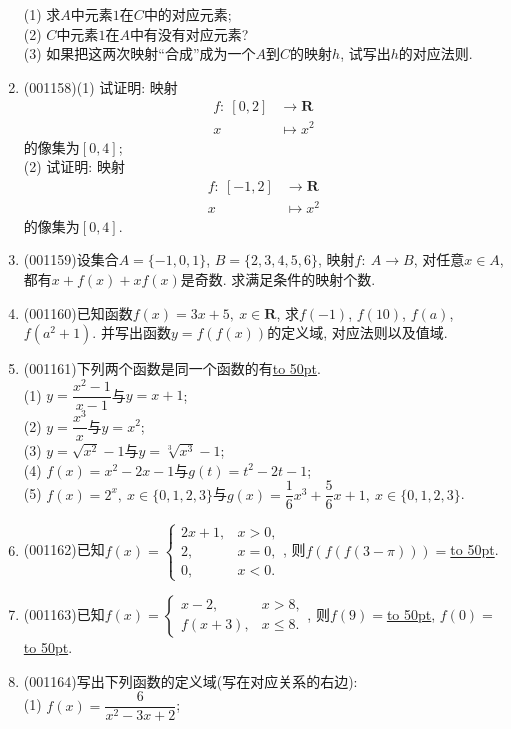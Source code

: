 \documentclass[10pt,a4paper]{article}
\newcommand{\blank}[1]{\underline{\hbox to #1pt{}}}
\begin{document}
\begin{enumerate}[1.]
(1) 求$A$中元素$1$在$C$中的对应元素;\\ 
(2) $C$中元素$1$在$A$中有没有对应元素?\\ 
(3) 如果把这两次映射``合成''成为一个$A$到$C$的映射$h$, 试写出$h$的对应法则.
\item {\tiny (001158)}(1) 试证明: 映射
\begin{align*}
f:\ [0,2]&\rightarrow \mathbf{R}\\
x&\mapsto x^2
\end{align*}
的像集为$[0,4]$;\\ 
(2) 试证明: 映射
\begin{align*}
f:\ [-1,2]&\rightarrow \mathbf{R}\\
x& \mapsto x^2
\end{align*}
的像集为$[0,4]$.
\item {\tiny (001159)}设集合$A=\{-1, 0, 1\}$, $B=\{2,3,4,5,6\}$, 映射$f:\ A\rightarrow B$, 对任意$x\in A$, 都有$x+f(x)+xf(x)$是奇数. 求满足条件的映射个数.
\item {\tiny (001160)}已知函数$f(x)=3x+5, \ x\in \mathbf{R}$, 求$f(-1)$, $f(10)$, $f(a)$, $f(a^2+1)$. 并写出函数$y=f(f(x))$的定义域, 对应法则以及值域.
\item {\tiny (001161)}下列两个函数是同一个函数的有\blank{50}.\\ 
(1) $y=\dfrac{x^2-1}{x-1}$与$y=x+1$;\\ 
(2) $y=\dfrac{x^3}{x}$与$y=x^2$;\\ 
(3) $y=\sqrt{x^2}-1$与$y=\sqrt[3]{x^3}-1$;\\ 
(4) $f(x)=x^2-2x-1$与$g(t)=t^2-2t-1$;\\ 
(5) $f(x)=2^x, \ x \in \{0,1,2,3\}$与$g(x)=\dfrac16x^3+\dfrac56x+1, \ x \in \{0,1,2,3\}$.
\item {\tiny (001162)}已知$f(x)=\left\{\begin{array}{cc}2x+1, & x>0,\\2, & x=0,\\0, & x<0.\end{array}\right.$, 则$f(f(f(3-\pi)))=$\blank{50}.
\item {\tiny (001163)}已知$f(x)=\left\{\begin{array}{cc}x-2, & x>8,\\f(x+3), & x\le 8.\end{array}\right.$, 则$f(9)=$\blank{50}, $f(0)=$\blank{50}.
\item {\tiny (001164)}写出下列函数的定义域(写在对应关系的右边):\\ 
(1) $f(x)=\dfrac{6}{x^2-3x+2}$;\\ 

\end{enumerate}
\end{document}
